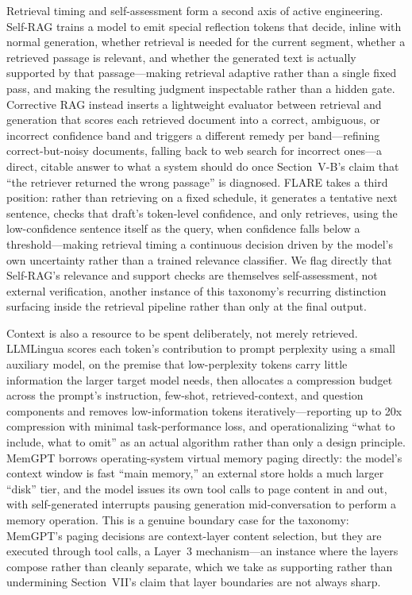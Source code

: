\documentclass[journal]{IEEEtran}
\begin{document}
Retrieval timing and self-assessment form a second axis of active engineering. Self-RAG \cite{asai2023selfrag} trains a model to emit special reflection tokens that decide, inline with normal generation, whether retrieval is needed for the current segment, whether a retrieved passage is relevant, and whether the generated text is actually supported by that passage---making retrieval adaptive rather than a single fixed pass, and making the resulting judgment inspectable rather than a hidden gate. Corrective RAG \cite{yan2024corrective} instead inserts a lightweight evaluator between retrieval and generation that scores each retrieved document into a correct, ambiguous, or incorrect confidence band and triggers a different remedy per band---refining correct-but-noisy documents, falling back to web search for incorrect ones---a direct, citable answer to what a system should do once Section~V-B's claim that ``the retriever returned the wrong passage'' is diagnosed. FLARE \cite{jiang2023active} takes a third position: rather than retrieving on a fixed schedule, it generates a tentative next sentence, checks that draft's token-level confidence, and only retrieves, using the low-confidence sentence itself as the query, when confidence falls below a threshold---making retrieval timing a continuous decision driven by the model's own uncertainty rather than a trained relevance classifier. We flag directly that Self-RAG's relevance and support checks are themselves self-assessment, not external verification, another instance of this taxonomy's recurring distinction surfacing inside the retrieval pipeline rather than only at the final output.

Context is also a resource to be spent deliberately, not merely retrieved. LLMLingua \cite{jiang2023llmlingua} scores each token's contribution to prompt perplexity using a small auxiliary model, on the premise that low-perplexity tokens carry little information the larger target model needs, then allocates a compression budget across the prompt's instruction, few-shot, retrieved-context, and question components and removes low-information tokens iteratively---reporting up to 20x compression with minimal task-performance loss, and operationalizing ``what to include, what to omit'' as an actual algorithm rather than only a design principle. MemGPT \cite{packer2023memgpt} borrows operating-system virtual memory paging directly: the model's context window is fast ``main memory,'' an external store holds a much larger ``disk'' tier, and the model issues its own tool calls to page content in and out, with self-generated interrupts pausing generation mid-conversation to perform a memory operation. This is a genuine boundary case for the taxonomy: MemGPT's paging decisions are context-layer content selection, but they are executed through tool calls, a Layer~3 mechanism---an instance where the layers compose rather than cleanly separate, which we take as supporting rather than undermining Section~VII's claim that layer boundaries are not always sharp.
\end{document}
